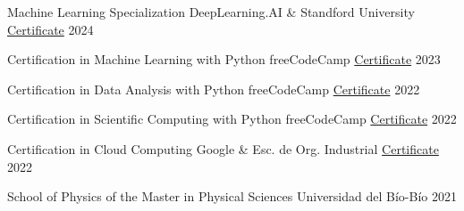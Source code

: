 

\begin{cvhonors}

  \cvhonor
    {Machine Learning Specialization} %
    {DeepLearning.AI \& Standford University} %
    {\href{https://www.coursera.org/account/accomplishments/specialization/9ZUV9TSH2GB6}{Certificate}} %
    {2024} %

  \cvhonor
    {Certification in Machine Learning with Python} %
    {freeCodeCamp} %
    {\href{https://www.freecodecamp.org/certification/_joacoh/machine-learning-with-python-v7}{Certificate}} %
    {2023} %

  \cvhonor
    {Certification in Data Analysis with Python} %
    {freeCodeCamp} %
    {\href{https://freecodecamp.org/certification/_joacoh/data-analysis-with-python-v7}{Certificate}} %
    {2022} %

  \cvhonor
    {Certification in Scientific Computing with Python} %
    {freeCodeCamp} %
    {\href{https://freecodecamp.org/certification/_joacoh/scientific-computing-with-python-v7}{Certificate}} %
    {2022} %

  \cvhonor
    {Certification in Cloud Computing} %
    {Google \& Esc. de Org. Industrial} %
    {\href{https://joacoh.github.io/files/cloud_certificate.pdf}{Certificate}} %
    {2022} %

  \cvhonor
    {School of Physics of the Master in Physical Sciences} %
    {Universidad del Bío-Bío} %
    {} %
    {2021} %

\end{cvhonors}
